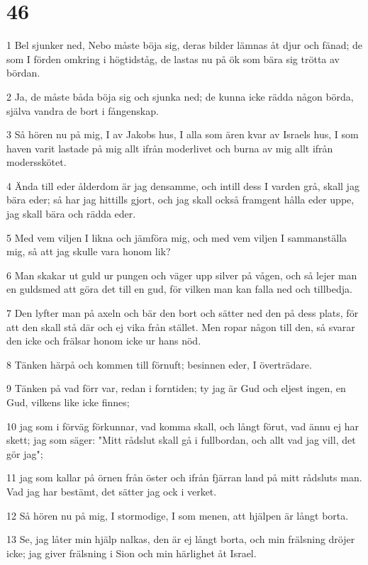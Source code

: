 \chapter{46}

\par 1 Bel sjunker ned, Nebo måste böja sig, deras bilder lämnas åt djur och fänad; de som I förden omkring i högtidståg, de lastas nu på ök som bära sig trötta av bördan.
\par 2 Ja, de måste båda böja sig och sjunka ned; de kunna icke rädda någon börda, själva vandra de bort i fångenskap.
\par 3 Så hören nu på mig, I av Jakobs hus, I alla som ären kvar av Israels hus, I som haven varit lastade på mig allt ifrån moderlivet och burna av mig allt ifrån modersskötet.
\par 4 Ända till eder ålderdom är jag densamme, och intill dess I varden grå, skall jag bära eder; så har jag hittills gjort, och jag skall också framgent hålla eder uppe, jag skall bära och rädda eder.
\par 5 Med vem viljen I likna och jämföra mig, och med vem viljen I sammanställa mig, så att jag skulle vara honom lik?
\par 6 Man skakar ut guld ur pungen och väger upp silver på vågen, och så lejer man en guldsmed att göra det till en gud, för vilken man kan falla ned och tillbedja.
\par 7 Den lyfter man på axeln och bär den bort och sätter ned den på dess plats, för att den skall stå där och ej vika från stället. Men ropar någon till den, så svarar den icke och frälsar honom icke ur hans nöd.
\par 8 Tänken härpå och kommen till förnuft; besinnen eder, I överträdare.
\par 9 Tänken på vad förr var, redan i forntiden; ty jag är Gud och eljest ingen, en Gud, vilkens like icke finnes;
\par 10 jag som i förväg förkunnar, vad komma skall, och långt förut, vad ännu ej har skett; jag som säger: "Mitt rådslut skall gå i fullbordan, och allt vad jag vill, det gör jag";
\par 11 jag som kallar på örnen från öster och ifrån fjärran land på mitt rådsluts man. Vad jag har bestämt, det sätter jag ock i verket.
\par 12 Så hören nu på mig, I stormodige, I som menen, att hjälpen är långt borta.
\par 13 Se, jag låter min hjälp nalkas, den är ej långt borta, och min frälsning dröjer icke; jag giver frälsning i Sion och min härlighet åt Israel.

